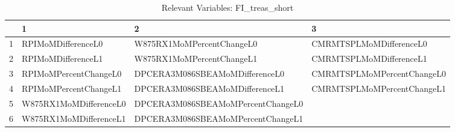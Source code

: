 \begin{longtable}{rlll}
\caption{Relevant Variables: FI_treas_short} \\ 
  \hline
 & 1 & 2 & 3 \\ 
  \hline
1 & RPIMoMDifferenceL0 & W875RX1MoMPercentChangeL0 & CMRMTSPLMoMDifferenceL0 \\ 
  2 & RPIMoMDifferenceL1 & W875RX1MoMPercentChangeL1 & CMRMTSPLMoMDifferenceL1 \\ 
  3 & RPIMoMPercentChangeL0 & DPCERA3M086SBEAMoMDifferenceL0 & CMRMTSPLMoMPercentChangeL0 \\ 
  4 & RPIMoMPercentChangeL1 & DPCERA3M086SBEAMoMDifferenceL1 & CMRMTSPLMoMPercentChangeL1 \\ 
  5 & W875RX1MoMDifferenceL0 & DPCERA3M086SBEAMoMPercentChangeL0 &  \\ 
  6 & W875RX1MoMDifferenceL1 & DPCERA3M086SBEAMoMPercentChangeL1 &  \\ 
   \hline
\hline
\end{longtable}
